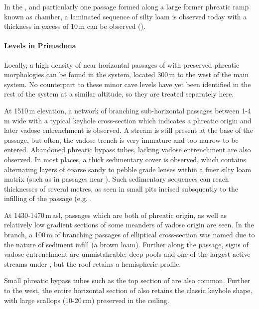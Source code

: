 In the , and particularly one passage formed along a large former phreatic ramp known as  chamber, a laminated sequence of silty loam is observed today with a thickness in excess of 10\,m can be observed ().

\paragraph{Levels in Primadona}

Locally, a high density of near horizontal passages of with preserved phreatic morphologies can be found in the  system, located 300\,m to the west of the main system. 
No counterpart to these minor cave levels have yet been identified in the rest of the system at a similar altitude, so they are treated separately here.

At 1510\,m elevation, a network of branching sub-horizontal passages between 1-4\,m wide with a typical keyhole cross-section which indicates a phreatic origin and later vadose entrenchment is observed. 
A stream is still present at the base of the passage, but often, the vadose trench is very immature and too narrow to be entered. 
Abandoned phreatic bypass tubes, lacking vadose entrenchment are also observed. 
In most places, a thick sedimentary cover is observed, which contains alternating layers of coarse sandy to pebble grade lenses within a finer silty loam matrix (such as in passages near ). 
Such sedimentary sequences can reach thicknesses of several metres, as seen in small pits incised subsquently to the infilling of the passage (e.g. .  

At 1430-1470\,m\,asl, passages which are both of phreatic origin, as well as relatively low gradient sections of some meanders of vadose origin are seen.
In the  branch,  a 100\,m of branching passages of elliptical cross-section was named  due to the nature of sediment infill (a brown loam). 
Further along the passage, signs of vadose entrenchment are unmistakeable: deep pools and one of the largest active streams under , but the roof retains a hemispheric profile.

Small phreatic bypass tubes such as the top section of  are also common. 
Further to the west, the entire horizontal section of  also retains the classic keyhole shape, with large scallops (10-20\,cm) preserved in the ceiling. 

